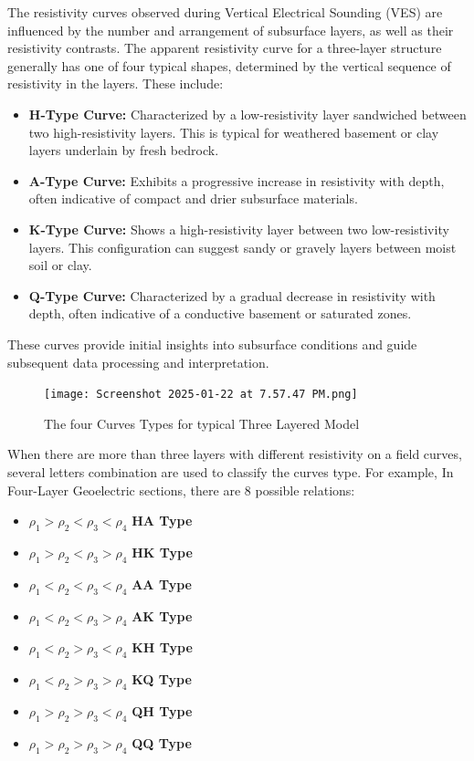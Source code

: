 \documentclass[12pt,a4paper]{report}
\begin{document}
The resistivity curves observed during Vertical Electrical Sounding (VES) are influenced by the number and arrangement of subsurface layers, as well as their resistivity contrasts. The apparent resistivity curve for a three-layer structure generally has one of four typical shapes, determined by the vertical sequence of resistivity in the layers. These include:
\begin{itemize}
    \item \textbf{H-Type Curve:} Characterized by a low-resistivity layer sandwiched between two high-resistivity layers. This is typical for weathered basement or clay layers underlain by fresh bedrock.
    \item \textbf{A-Type Curve:} Exhibits a progressive increase in resistivity with depth, often indicative of compact and drier subsurface materials.
    \item \textbf{K-Type Curve:} Shows a high-resistivity layer between two low-resistivity layers. This configuration can suggest sandy or gravely layers between moist soil or clay.
    \item \textbf{Q-Type Curve:} Characterized by a gradual decrease in resistivity with depth, often indicative of a conductive basement or saturated zones.
\end{itemize}

These curves provide initial insights into subsurface conditions and guide subsequent data processing and interpretation.

\begin{figure}[H]
    \centering
    \texttt{[image: Screenshot 2025-01-22 at 7.57.47 PM.png]}
    \caption{The four Curves Types for typical Three Layered Model }
    \label{fig:Four_Curves_Model}
\end{figure}

When there are more than three layers with different resistivity on a field curves, several letters combination are used to classify the curves type. For example, In Four-Layer Geoelectric sections, there are 8 possible relations: 

\begin{itemize}
    \item \(\rho_1 > \rho_2 < \rho_3 < \rho_4\) \textbf{HA Type}
    \item \(\rho_1 > \rho_2 < \rho_3 > \rho_4\) \textbf{HK Type}
    \item \(\rho_1 < \rho_2 < \rho_3 < \rho_4\) \textbf{AA Type}
    \item \(\rho_1 < \rho_2 < \rho_3 > \rho_4\) \textbf{AK Type}
    \item \(\rho_1 < \rho_2 > \rho_3 < \rho_4\) \textbf{KH Type}
    \item \(\rho_1 < \rho_2 > \rho_3 > \rho_4\) \textbf{KQ Type}
    \item \(\rho_1 > \rho_2 > \rho_3 < \rho_4\) \textbf{QH Type}
    \item \(\rho_1 > \rho_2 > \rho_3 > \rho_4\) \textbf{QQ Type}
\end{itemize}
\end{document}
